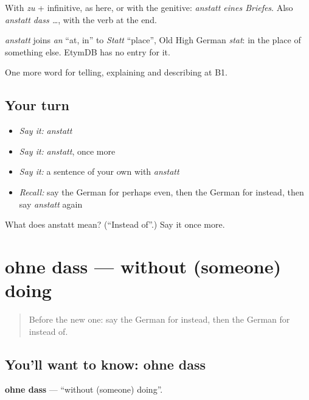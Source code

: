 With \emph{zu} + infinitive, as here, or with the genitive: \emph{anstatt eines Briefes}. Also \emph{anstatt dass …}, with the verb at the end.

\begin{cousinweb}
\emph{anstatt} joins \emph{an} \textquotedblleft{}at, in\textquotedblright{} to \emph{Statt} \textquotedblleft{}place\textquotedblright{}, Old High German \emph{stat}: in the place of something else. EtymDB has no entry for it.
\end{cousinweb}

\begin{grammarlens}[title={What you've built}]
One more word for telling, explaining and describing at B1.
\end{grammarlens}

\subsection*{Your turn}
\begin{itemize}
\raggedright
  \item \emph{Say it:} \emph{anstatt}
  \item \emph{Say it:} \emph{anstatt}, once more
  \item \emph{Say it:} a sentence of your own with \emph{anstatt}
  \item \emph{Recall:} say the German for perhaps even, then the German for instead, then say \emph{anstatt} again
\end{itemize}

\begin{tcolorbox}[breakable,colback=teal!4,colframe=teal!35!black,title={Before you move on}]
What does anstatt mean? (\textquotedblleft{}Instead of\textquotedblright{}.) Say it once more.
\end{tcolorbox}
\section[ohne dass]{ohne dass — without (someone) doing}

\label{lesson:GE-C368-ohne-dass}



\begin{quote}
Before the new one: say the German for instead, then the German for instead of.
\end{quote}

\subsection*{You'll want to know: ohne dass}
\textbf{ohne dass} — \textquotedblleft{}without (someone) doing\textquotedblright{}.

